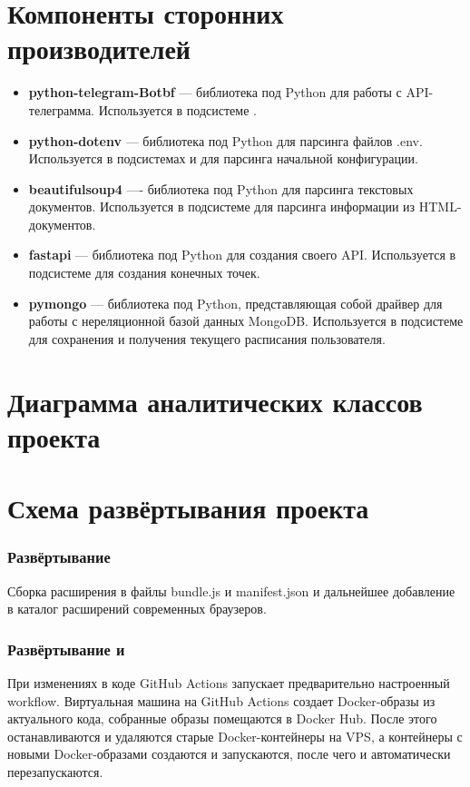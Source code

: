 	\section{Компоненты сторонних производителей}
		\begin{itemize}
			\item \textbf{python-telegram-Botbf} --- библиотека под Python для работы с API-телеграмма. Используется в подсистеме \Botbf{}.
			
			\item \textbf{python-dotenv} --- библиотека под Python для парсинга файлов .env. Используется в подсистемах \Botbf{} и \Backendbf{} для парсинга начальной конфигурации.
			
			\item \textbf{beautifulsoup4} ---- библиотека под Python для парсинга текстовых документов. Используется в подсистеме \Backendbf{} для парсинга информации из HTML-документов.
			
			\item \textbf{fastapi} --- библиотека под Python для создания своего API. Используется в подсистеме \Backendbf{} для создания конечных точек.
			
			\item \textbf{pymongo} --- библиотека под Python, представляющая собой драйвер для работы с нереляционной базой данных MongoDB. Используется в подсистеме \Botbf{} для сохранения и получения текущего расписания пользователя.
		\end{itemize}
	\section{Диаграмма аналитических классов проекта}
		\begin{figure}[H]
			\centering
			\def\svgwidth{\columnwidth}
			
		\end{figure}
	\section{Схема развёртывания проекта}
		\subsubsection{Развёртывание \Extensionbf{}}
			Сборка расширения в файлы bundle.js и manifest.json и дальнейшее добавление в каталог расширений современных браузеров.
		\subsubsection{Развёртывание \Botbf{} и \Backendbf{}}
			При изменениях в коде GitHub Actions запускает предварительно настроенный workflow. Виртуальная 	машина на GitHub Actions создает Docker-образы из актуального кода, собранные образы помещаются в Docker Hub. После этого останавливаются и удаляются старые Docker-контейнеры на VPS, а контейнеры 
			с новыми Docker-образами создаются и запускаются, после чего \Botbf{} и \Backendbf{} автоматически перезапускаются.
